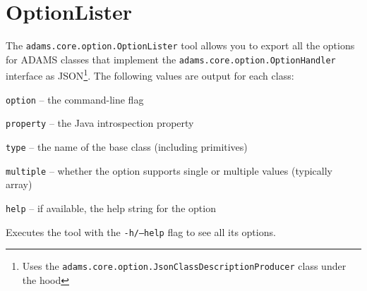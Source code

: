 \documentclass[a4paper]{book}
\begin{document}
\section{OptionLister}
The \texttt{adams.core.option.OptionLister} tool allows you to export all the options for
ADAMS classes that implement the \texttt{adams.core.option.OptionHandler} interface
as JSON\footnote{Uses the \texttt{adams.core.option.JsonClassDescriptionProducer} class under the hood}.
The following values are output for each class:
\begin{tight_itemize}
    \item \texttt{option} -- the command-line flag
    \item \texttt{property} -- the Java introspection property
    \item \texttt{type} -- the name of the base class (including primitives)
    \item \texttt{multiple} -- whether the option supports single or multiple values (typically array)
    \item \texttt{help} -- if available, the help string for the option
\end{tight_itemize}
Executes the tool with the \texttt{-h/--help} flag to see all its options.


\end{document}
